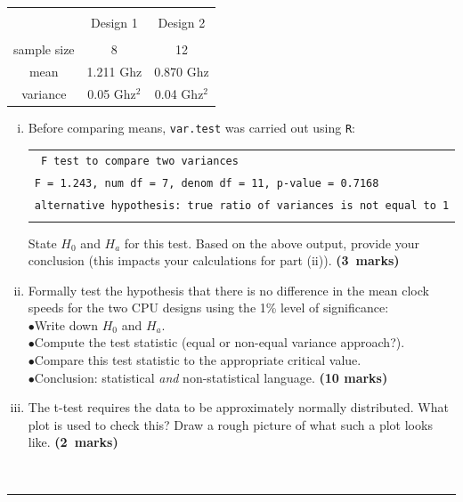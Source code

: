 \documentclass[12pt]{article}
\begin{document}
\begin{enumerate}[a)]
\begin{small}
\begin{center}
\begin{tabular}{|c|c|c|}
\hline
&&\\[-0.3cm]
& Design 1 & Design 2 \\
\hline
&&\\[-0.2cm]
sample size      & 8 & 12 \\[0.2cm]
mean   & 1.211\,\,Ghz  & 0.870\,\,Ghz \\[0.2cm]
variance &  0.05\,\,Ghz$^2$ & 0.04\,\,Ghz$^2$ \\[0.2cm]
\hline
\end{tabular}
\end{center}
\end{small}
\begin{enumerate}[i)]\itemsep0.6cm
    \item Before comparing means, \texttt{var.test} was carried out using \texttt{R}:\\[0.2cm]
\begin{footnotesize}
\begin{tabular}{|l|}
\hline
\texttt{            F test to compare two variances} \\
\texttt{F = 1.243, num df = 7, denom df = 11, p-value = 0.7168}\\
\texttt{alternative hypothesis: true ratio of variances is not equal to 1}\\
\hline
\multicolumn{1}{c}{}
\end{tabular}
\end{footnotesize}
State $H_0$ and $H_a$ for this test. Based on the above output, provide your conclusion (this impacts your calculations for part (ii)).    \hfill{\mbox{\scriptsize \bf (3 marks)}}
    \item Formally test the hypothesis that there is no difference in the mean clock speeds for the two CPU designs using the 1\% level of \mbox{significance:}\\[0.15cm]
        $\bullet$\quad Write down $H_0$ and $H_a$.\\[0.15cm]
        $\bullet$\quad Compute the test statistic (equal or non-equal variance approach?).\\[0.15cm]
        $\bullet$\quad Compare this test statistic to the appropriate critical value.\\[0.15cm]
        $\bullet$\quad Conclusion: statistical \emph{and} non-statistical language.
     \hfill{\scriptsize \bf (10 marks)}
     \item The t-test requires the data to be approximately normally distributed. What plot is used to check this? Draw a rough picture of what such a plot looks like. \hfill{\mbox{\scriptsize \bf (2 marks)}}
    \end{enumerate}
\end{enumerate}
\quad\\[-0.3cm]
\noindent\rule{\linewidth}{1pt}
\end{document}
